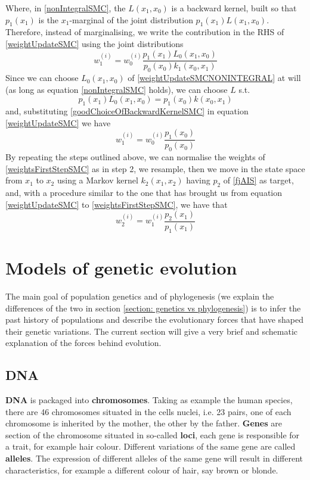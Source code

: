 \documentclass[12pt,mythesisstyle]{report}
\begin{document}
Where, in \eqref{nonIntegralSMC}, the $L(x_1,x_0)$ is a backward kernel, built so that $p_1(x_1)$ is the $x_1$-marginal of the joint distribution $p_1(x_1)L(x_1,x_0)$. Therefore, instead of marginalising, we write the contribution in the RHS of \eqref{weightUpdateSMC} using the joint distributions
\begin{equation}\label{weightUpdateSMCNONINTEGRAL}
w^{(i)}_1=w^{(i)}_0\frac{p_1(x_1)L_0(x_1,x_0)}{p_0(x_0)k_1(x_0,x_1)}
\end{equation}
Since we can choose $L_0(x_1,x_0)$ of \eqref{weightUpdateSMCNONINTEGRAL} at will (as long as equation \eqref{nonIntegralSMC} holds), we can choose $L$ s.t.
\begin{equation}\label{goodChoiceOfBackwardKernelSMC}
p_1(x_1)L_0(x_1,x_0)=p_1(x_0)k(x_0,x_1)
\end{equation}
and, substituting \eqref{goodChoiceOfBackwardKernelSMC} in equation \eqref{weightUpdateSMC} we have
\begin{equation}\label{weightsFirstStepSMC}
w^{(i)}_1=w^{(i)}_0\frac{p_1(x_0)}{p_0(x_0)}
\end{equation}
By repeating the steps outlined above, we can normalise the weights of \eqref{weightsFirstStepSMC} as in step 2, we resample, then we move in the state space from $x_1$ to $x_2$ using a Markov kernel $k_2(x_1,x_2)$ having $p_2$ of \eqref{fjAIS} as target, and, with a procedure similar to the one that has brought us from equation \eqref{weightUpdateSMC} to \eqref{weightsFirstStepSMC}, we have that
\begin{equation}\label{weightsSecondStepSMC}
w^{(i)}_2=w^{(i)}_1\frac{p_2(x_1)}{p_1(x_1)}
\end{equation}

\section{Models of genetic evolution}\label{section: models of genetic evolution}
\begin{comment}
LEO: E' COPIATO DAL PAPER WRIGHT FISHER EXPLANATION QUINDI CAMBIALO A LUNGO TEMRINE
\end{comment}
The main goal of population genetics and of phylogenesis (we explain the differences of the two in section \ref{section: genetics vs phylogenesis}) is to infer the past history of populations and describe the evolutionary forces that have shaped their genetic variations. The current section will give a very brief and schematic explanation of the forces behind evolution.
\subsection{DNA}
\textbf{DNA} is packaged into \textbf{chromosomes}. Taking as example the human species, there are 46 chromosomes situated in the cells nuclei, i.e. 23 pairs, one of each chromosome is inherited by the mother, the other by the father. \textbf{Genes} are section of the chromosome situated in so-called \textbf{loci}, each gene is responsible for a trait, for example hair colour. Different variations of the same gene are called \textbf{alleles}. The expression of different alleles of the same gene will result in different characteristics, for example a different colour of hair, say brown or blonde.
\end{document}
